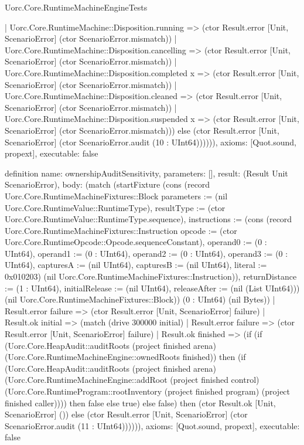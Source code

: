 \begin{lexlean}{Uorc.Core.RuntimeMachineEngineTests}
\begin{semanticmodule}
{        | Uorc.Core.RuntimeMachine::Disposition.running => (ctor Result.error [Unit, ScenarioError] (ctor ScenarioError.mismatch))
        | Uorc.Core.RuntimeMachine::Disposition.cancelling => (ctor Result.error [Unit, ScenarioError] (ctor ScenarioError.mismatch))
        | Uorc.Core.RuntimeMachine::Disposition.completed x => (ctor Result.error [Unit, ScenarioError] (ctor ScenarioError.mismatch))
        | Uorc.Core.RuntimeMachine::Disposition.cleaned => (ctor Result.error [Unit, ScenarioError] (ctor ScenarioError.mismatch))
        | Uorc.Core.RuntimeMachine::Disposition.suspended x => (ctor Result.error [Unit, ScenarioError] (ctor ScenarioError.mismatch))) else (ctor Result.error [Unit, ScenarioError] (ctor ScenarioError.audit (10 : UInt64)))))),
  axioms: [Quot.sound, propext],
  executable: false
}

definition{
  name: ownershipAuditSensitivity,
  parameters: [],
  result: (Result Unit ScenarioError),
  body: (match (startFixture (cons (record Uorc.Core.RuntimeMachineFixtures::Block {parameters := (nil Uorc.Core.RuntimeValue::RuntimeType), resultType := (ctor Uorc.Core.RuntimeValue::RuntimeType.sequence), instructions := (cons (record Uorc.Core.RuntimeMachineFixtures::Instruction {opcode := (ctor Uorc.Core.RuntimeOpcode::Opcode.sequenceConstant), operand0 := (0 : UInt64), operand1 := (0 : UInt64), operand2 := (0 : UInt64), operand3 := (0 : UInt64), capturesA := (nil UInt64), capturesB := (nil UInt64), literal := 0x010203}) (nil Uorc.Core.RuntimeMachineFixtures::Instruction)), returnDistance := (1 : UInt64), initialRelease := (nil UInt64), releaseAfter := (nil (List UInt64))}) (nil Uorc.Core.RuntimeMachineFixtures::Block)) (0 : UInt64) (nil Bytes))
    | Result.error failure => (ctor Result.error [Unit, ScenarioError] failure)
    | Result.ok initial => (match (drive 300000 initial)
      | Result.error failure => (ctor Result.error [Unit, ScenarioError] failure)
      | Result.ok finished => (if (if (Uorc.Core.HeapAudit::auditRoots (project finished arena) (Uorc.Core.RuntimeMachineEngine::ownedRoots finished)) then (if (Uorc.Core.HeapAudit::auditRoots (project finished arena) (Uorc.Core.RuntimeMachineEngine::addRoot (project finished control) (Uorc.Core.RuntimeProgram::rootInventory (project finished program) (project finished caller)))) then false else true) else false) then (ctor Result.ok [Unit, ScenarioError] ()) else (ctor Result.error [Unit, ScenarioError] (ctor ScenarioError.audit (11 : UInt64)))))),
  axioms: [Quot.sound, propext],
  executable: false
}


\end{semanticmodule}
\end{lexlean}
